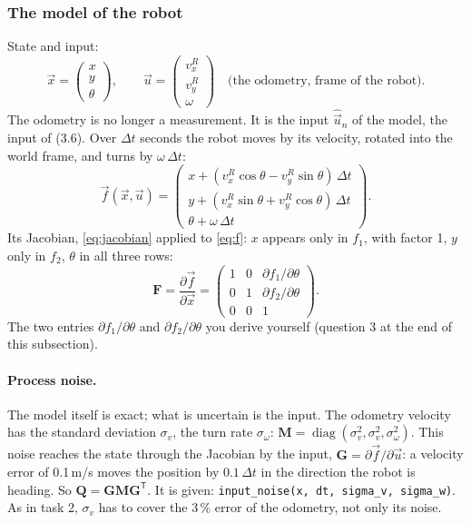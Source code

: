 \documentclass[11pt,a4paper,parskip=half]{scrartcl}
\newcommand{\thema}[1]{\texttt{#1}}
\newcommand{\mat}[1]{\mathbf{#1}}
\newcommand{\T}{^{\mathsf{T}}}
\begin{document}
\subsubsection*{The model of the robot}
State and input:
\begin{equation*}
  \vec x = \begin{pmatrix} x \\ y \\ \theta \end{pmatrix}, \qquad
  \vec u = \begin{pmatrix} v_x^R \\ v_y^R \\ \omega \end{pmatrix} \quad\text{(the odometry, frame of the robot).}
\end{equation*}
The odometry is no longer a measurement. It is the input \(\hat{\vec u}_n\) of the model, the input of (3.6). Over
\(\Delta t\) seconds the robot moves by its velocity, rotated into the world frame, and turns by \(\omega\,\Delta t\):
\begin{equation}
  \vec f(\vec x, \vec u) =
  \begin{pmatrix}
    x + (v_x^R \cos\theta - v_y^R \sin\theta)\,\Delta t \\
    y + (v_x^R \sin\theta + v_y^R \cos\theta)\,\Delta t \\
    \theta + \omega\,\Delta t
  \end{pmatrix} .
  \label{eq:f}
\end{equation}
Its Jacobian, \cref{eq:jacobian} applied to \cref{eq:f}: \(x\) appears only in \(f_1\), with factor 1, \(y\)
only in \(f_2\), \(\theta\) in all three rows:
\begin{equation}
  \mat F = \frac{\partial \vec f}{\partial \vec x}
  = \begin{pmatrix}
      1 & 0 & \partial f_1 / \partial\theta \\
      0 & 1 & \partial f_2 / \partial\theta \\
      0 & 0 & 1
    \end{pmatrix} .
  \label{eq:F}
\end{equation}
The two entries \(\partial f_1/\partial\theta\) and \(\partial f_2/\partial\theta\) you derive yourself (question 3 at the end of this subsection).

\paragraph{Process noise.} The model itself is exact; what is uncertain is the input. The odometry velocity has the
standard deviation \(\sigma_v\), the turn rate \(\sigma_\omega\):
\(\mat M = \operatorname{diag}(\sigma_v^2, \sigma_v^2, \sigma_\omega^2)\). This noise reaches the state through the
Jacobian by the input, \(\mat G = \partial \vec f / \partial \vec u\): a velocity error of 0.1\,m/s moves the
position by \(0.1\,\Delta t\) in the direction the robot is heading. So \(\mat Q = \mat G \mat M \mat G\T\). It is given:
\thema{input\_noise(x, dt, sigma\_v, sigma\_w)}. As in task 2, \(\sigma_v\) has to cover the 3\,\% error of the
odometry, not only its noise.
\end{document}
